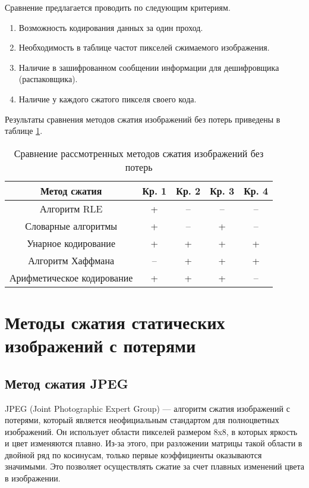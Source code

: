 Сравнение предлагается проводить по следующим критериям.
\begin{enumerate}
    \item Возможность кодирования данных за один проход.
    \item Необходимость в таблице частот пикселей сжимаемого изображения.
    \item Наличие в зашифрованном сообщении информации для дешифровщика (распаковщика).
    \item Наличие у каждого сжатого пикселя своего кода.
\end{enumerate}

Результаты сравнения методов сжатия изображений без потерь приведены в таблице \ref{tbl:compare_realizations1}.
\begin{table}[H]
    \centering
	\caption{Сравнение рассмотренных методов сжатия изображений без потерь}
    \label{tbl:compare_realizations1}
	\begin{tabular}{|c|c|c|c|c|}
        \hline
        \textbf{Метод сжатия} & \textbf{Кр. 1} & \textbf{Кр. 2} & \textbf{Кр. 3} & \textbf{Кр. 4}
        \\ \hline
        Алгоритм RLE               & +  & -- & -- & -- \\ \hline
        Словарные алгоритмы        & +  & -- & +  & -- \\ \hline
        Унарное кодирование        & +  & +  & +  & +  \\ \hline
        Алгоритм Хаффмана          & -- & +  & +  & +  \\ \hline
        Арифметическое кодирование & +  & +  & +  & -- \\ \hline
    \end{tabular}
\end{table}

\section{Методы сжатия статических изображений с потерями}

\subsection{Метод сжатия JPEG}

JPEG (Joint Photographic Expert Group) --- алгоритм сжатия изображений с потерями, который является неофициальным стандартом для полноцветных изображений. Он использует области пикселей размером 8x8, в которых яркость и цвет изменяются плавно. Из-за этого, при разложении матрицы такой области в двойной ряд по косинусам, только первые коэффициенты оказываются значимыми. Это позволяет осуществлять сжатие за счет плавных изменений цвета в изображении.

